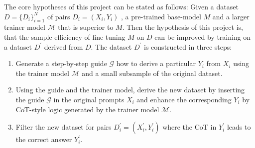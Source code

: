 \documentclass[11pt]{article}
\begin{document}
    The core hypotheses of this project can be stated as follows:
    Given a dataset $D = \{D_i\}_{i=1}^N$ of pairs $D_i = (X_i, Y_i)$ , a pre-trained base-model $M$ and
    a larger trainer model $\mathcal{M}$ that is superior to $M$.
    Then the hypothesis of this project is, that the sample-efficiency of fine-tuning $M$ on $D$ can be improved by
    training on a dataset $D^\prime$ derived from $D$.
    The dataset $D^\prime$ is constructed in three steps:
    \begin{enumerate}
        \item Generate a step-by-step guide $\mathcal{G}$ how to derive a particular $Y_i$ from $X_i$ using the trainer model
        $\mathcal{M}$ and a small subsample of the original dataset.
        \item Using the guide and the trainer model, derive the new dataset by inserting the guide $\mathcal{G}$ in the
        original prompts $X_i$ and enhance the corresponding $Y_i$ by CoT-style logic generated by the trainer model $\mathcal{M}$.
        \item Filter the new dataset for pairs $D^\prime_i = (X^\prime_i, Y^\prime_i)$ where the CoT in $Y^\prime_i$
        leads to the correct answer $Y^\prime_i$.
    \end{enumerate}

\end{document}
